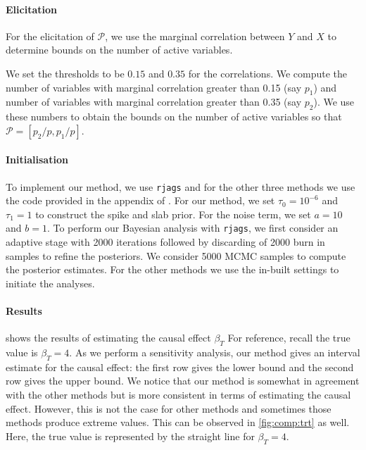 \documentclass[preprint,12pt]{elsarticle}
\begin{document}
\paragraph{Elicitation}
For the
elicitation of $\mathcal{P}$, we use the marginal correlation between 
$Y$ and $X$ to determine bounds on the number of active variables.

We set the thresholds to be $0.15$ and $0.35$ for the correlations.
We compute the
number of variables with marginal correlation greater than 0.15
(say $p_1$) and number of variables with  marginal 
correlation greater than 0.35 (say $p_2$). 
We use these numbers to obtain the bounds on the number of active
variables so that $\mathcal{P}=[p_2/p , p_1/p]$.

\paragraph{Initialisation} 
To implement our method, we use \texttt{rjags} and for the other three
methods we use the code provided in the appendix of \citep{koch2020}.
For our method, we set $\tau_0=10^{-6}$ and $\tau_1=1$ to construct the
spike and slab prior.
For the noise term, we set $a=10$ and $b=1$.
To perform 
our Bayesian analysis with \texttt{rjags}, we first consider an adaptive 
stage with 2000 iterations followed by discarding of 2000 burn in samples 
to refine the posteriors. We consider 5000 MCMC samples to compute the
posterior estimates. For the other methods we use the in-built settings 
to initiate the analyses.

\paragraph{Results}
 shows the results of estimating the causal effect $\beta_T$
For reference, recall the true value is $\beta_T=4$. 
As we perform a sensitivity analysis,
our method gives an interval estimate for the causal effect:
the first row gives the lower bound
and the second row gives the upper bound. We notice that our method is 
somewhat in agreement with the other methods but is more consistent
in terms of estimating the causal effect. However, this is not the
case for other methods and sometimes those methods produce extreme 
values. This can be observed in \cref{fig:comp:trt} as well. Here, the true 
value is represented by the straight line for $\beta_T = 4$. 
\end{document}
